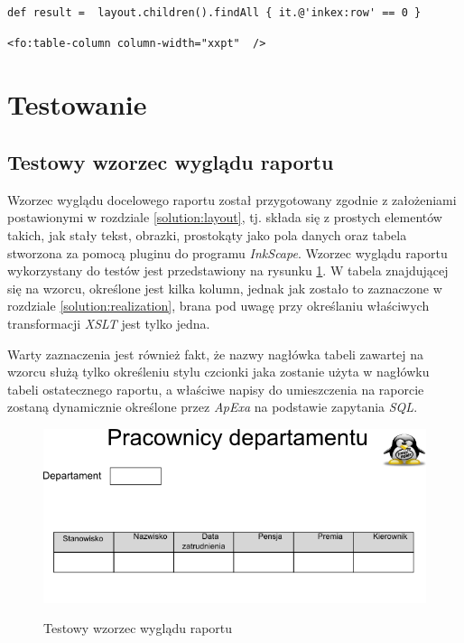 \documentclass[11pt,a4paper]{article}
\begin{document}
\lstset{language=Java}
\begin{lstlisting}[frame=single,caption=Instrukcja \emph{Groovy} wyszukująca element tabeli, label=groovy:column]
def result =  layout.children().findAll { it.@'inkex:row' == 0 }

\end{lstlisting}

\lstset{language=XSLT}
\begin{lstlisting}[frame=single,caption=Konstrukcja XSLT ustawiająca szerokość kolumny, label=width:xslt]
<fo:table-column column-width="xxpt"  />
\end{lstlisting}


\newpage
\section{Testowanie} \label{test}
\subsection{Testowy wzorzec wyglądu raportu} \label{test:layout}
Wzorzec wyglądu docelowego raportu został przygotowany zgodnie z założeniami postawionymi w rozdziale \ref{solution:layout}, tj. składa się z prostych elementów takich, jak stały tekst, obrazki, prostokąty jako pola danych oraz tabela stworzona za pomocą pluginu do programu \emph{InkScape}. Wzorzec wyglądu raportu wykorzystany do testów jest przedstawiony na rysunku \ref{img:sampleLayout}. W tabela znajdującej się na wzorcu, określone jest kilka kolumn, jednak jak zostało to zaznaczone w rozdziale \ref{solution:realization}, brana pod uwagę przy określaniu właściwych transformacji \emph{XSLT} jest tylko jedna. 

Warty zaznaczenia jest również fakt, że nazwy nagłówka tabeli zawartej na wzorcu służą tylko określeniu stylu czcionki jaka zostanie użyta w nagłówku tabeli ostatecznego raportu, a właściwe napisy do umieszczenia na raporcie zostaną dynamicznie określone przez \emph{ApExa} na podstawie zapytania \emph{SQL}.

\begin{figure}[h]
\centering
\caption{Testowy wzorzec wyglądu raportu}
\includegraphics[scale=0.8]{sampleLayout}
\label{img:sampleLayout}
\end{figure}
\end{document}
